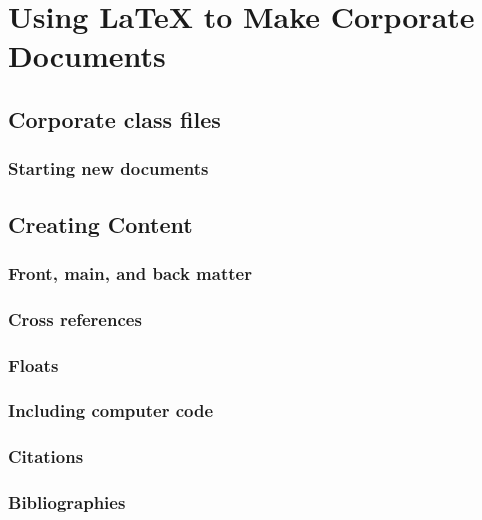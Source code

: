 \chapter{Using LaTeX to Make Corporate Documents }


\section{Corporate class files}\label{sec:Corporatecls}


\subsection{Starting new documents}\label{sec:NewDocs}


\section{Creating Content}
\subsection{Front, main, and back matter}


\subsection{Cross references}


\subsection{Floats}


\subsection{Including computer code}\label{Sec:Codes}


\subsection{Citations}\label{Sec:Citations}


\subsection{Bibliographies}\label{Sec:Bibliographies}


